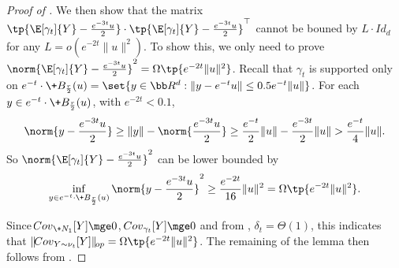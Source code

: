 \begin{proof}[Proof of ]
    We then show that the matrix $\tp{\E[\gamma_t]{Y} - \frac{e^{-3t}u}{2}}\cdot \tp{\E[\gamma_t]{Y} - \frac{e^{-3t}u}{2}}^\top$ cannot be bouned by $L\cdot \!{Id}_d$ for any $L=o(e^{-2t}\|u\|^2)$. To show this, we only need to prove $\norm{\E[\gamma_t]{Y} - \frac{e^{-3t}u}{2}}^2 = \Omega\tp{e^{-2t}\|u\|^2}$. Recall that $\gamma_t$ is supported only on $ e^{-t}\cdot \+B_{\frac{r}{2}}(u) = \set{y\in \bb R^d: \| y - e^{-t}u\| \leq 0.5 e^{-t} \|u\|}$. For each $y\in e^{-t}\cdot \+B_{\frac{r}{2}}(u)$, with $e^{-2t}<0.1$,
    \[
        \norm{ y- \frac{e^{-3t}u}{2} } \geq \|y\| - \norm{\frac{e^{-3t}u}{2}} \geq \frac{e^{-t}}{2} \|u\| - \frac{e^{-3t}}{2} \|u\| > \frac{e^{-t}}{4} \|u\|.
    \]
    So $\norm{\E[\gamma_t]{Y} - \frac{e^{-3t}u}{2}}^2$ can be lower bounded by 
    \[
        \inf_{y\in  e^{-t}\cdot \+B_{\frac{r}{2}}(u)} \norm{y - \frac{e^{-3t}u}{2}}^2  \geq \frac{e^{-2t}}{16} \|u\|^2 = \Omega\tp{e^{-2t}\|u\|^2}.
    \]
    
    Since $\!{Cov}_{\+N_1}[Y]\mge 0$, $\!{Cov}_{\gamma_t}[Y]\mge 0$ and from , $\delta_t=\Theta(1)$, this indicates that $\|\!{Cov}_{Y\sim \nu_t}[Y]\|_{\!{op}} = \Omega\tp{e^{-2t}\|u\|^2}$.
    The remaining of the lemma then follows from .
\end{proof}

